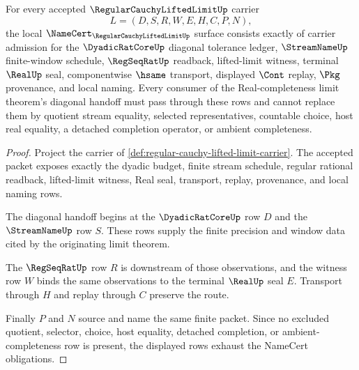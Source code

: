 \begin{theorem}
\label{thm:regular-cauchy-lifted-limit-namecert-obligations}
For every accepted $\RegularCauchyLiftedLimitUp$ carrier
$$
L=(D,S,R,W,E,H,C,P,N),
$$
the local $\NameCert_{\RegularCauchyLiftedLimitUp}$ surface consists exactly of carrier admission for the $\DyadicRatCoreUp$ diagonal tolerance ledger, $\StreamNameUp$ finite-window schedule, $\RegSeqRatUp$ readback, lifted-limit witness, terminal $\RealUp$ seal, componentwise $\hsame$ transport, displayed $\Cont$ replay, $\Pkg$ provenance, and local naming. Every consumer of the Real-completeness limit theorem's diagonal handoff must pass through these rows and cannot replace them by quotient stream equality, selected representatives, countable choice, host real equality, a detached completion operator, or ambient completeness.
\end{theorem}
\begin{proof}
Project the carrier of \autoref{def:regular-cauchy-lifted-limit-carrier}. The accepted packet exposes exactly the dyadic budget, finite stream schedule, regular rational readback, lifted-limit witness, Real seal, transport, replay, provenance, and local naming rows.

The diagonal handoff begins at the $\DyadicRatCoreUp$ row $D$ and the $\StreamNameUp$ row $S$. These rows supply the finite precision and window data cited by the originating limit theorem.

The $\RegSeqRatUp$ row $R$ is downstream of those observations, and the witness row $W$ binds the same observations to the terminal $\RealUp$ seal $E$. Transport through $H$ and replay through $C$ preserve the route.

Finally $P$ and $N$ source and name the same finite packet. Since no excluded quotient, selector, choice, host equality, detached completion, or ambient-completeness row is present, the displayed rows exhaust the NameCert obligations.
\end{proof}

